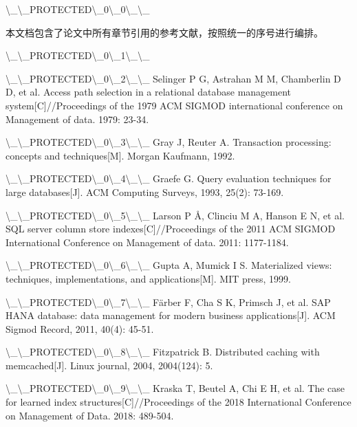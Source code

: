 \textbackslash{}_\textbackslash{}_PROTECTED\textbackslash{}_0\textbackslash{}_0\textbackslash{}_\textbackslash{}_

本文档包含了论文中所有章节引用的参考文献，按照统一的序号进行编排。

\textbackslash{}_\textbackslash{}_PROTECTED\textbackslash{}_0\textbackslash{}_1\textbackslash{}_\textbackslash{}_

\textbackslash{}_\textbackslash{}_PROTECTED\textbackslash{}_0\textbackslash{}_2\textbackslash{}_\textbackslash{}_ Selinger P G, Astrahan M M, Chamberlin D D, et al. Access path selection in a relational database management system[C]//Proceedings of the 1979 ACM SIGMOD international conference on Management of data. 1979: 23-34.

\textbackslash{}_\textbackslash{}_PROTECTED\textbackslash{}_0\textbackslash{}_3\textbackslash{}_\textbackslash{}_ Gray J, Reuter A. Transaction processing: concepts and techniques[M]. Morgan Kaufmann, 1992.

\textbackslash{}_\textbackslash{}_PROTECTED\textbackslash{}_0\textbackslash{}_4\textbackslash{}_\textbackslash{}_ Graefe G. Query evaluation techniques for large databases[J]. ACM Computing Surveys, 1993, 25(2): 73-169.

\textbackslash{}_\textbackslash{}_PROTECTED\textbackslash{}_0\textbackslash{}_5\textbackslash{}_\textbackslash{}_ Larson P Å, Clinciu M A, Hanson E N, et al. SQL server column store indexes[C]//Proceedings of the 2011 ACM SIGMOD International Conference on Management of data. 2011: 1177-1184.

\textbackslash{}_\textbackslash{}_PROTECTED\textbackslash{}_0\textbackslash{}_6\textbackslash{}_\textbackslash{}_ Gupta A, Mumick I S. Materialized views: techniques, implementations, and applications[M]. MIT press, 1999.

\textbackslash{}_\textbackslash{}_PROTECTED\textbackslash{}_0\textbackslash{}_7\textbackslash{}_\textbackslash{}_ Färber F, Cha S K, Primsch J, et al. SAP HANA database: data management for modern business applications[J]. ACM Sigmod Record, 2011, 40(4): 45-51.

\textbackslash{}_\textbackslash{}_PROTECTED\textbackslash{}_0\textbackslash{}_8\textbackslash{}_\textbackslash{}_ Fitzpatrick B. Distributed caching with memcached[J]. Linux journal, 2004, 2004(124): 5.

\textbackslash{}_\textbackslash{}_PROTECTED\textbackslash{}_0\textbackslash{}_9\textbackslash{}_\textbackslash{}_ Kraska T, Beutel A, Chi E H, et al. The case for learned index structures[C]//Proceedings of the 2018 International Conference on Management of Data. 2018: 489-504.

